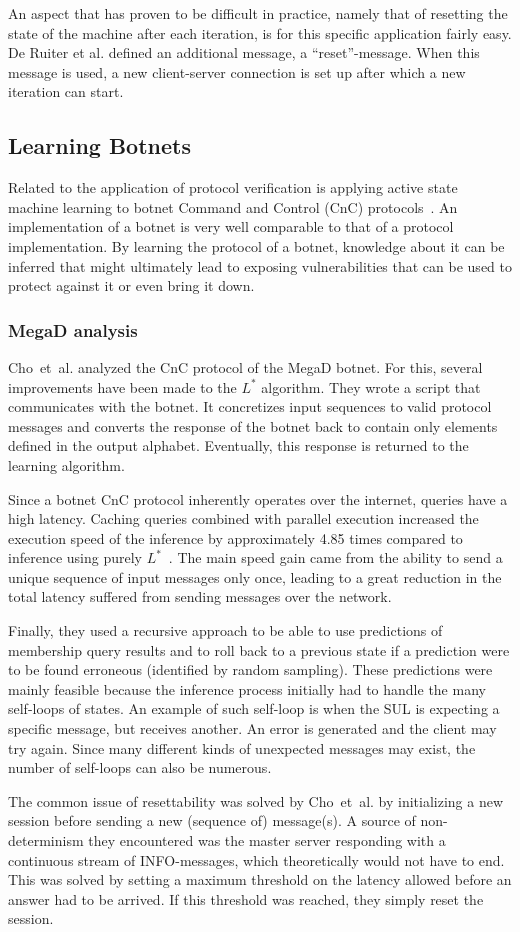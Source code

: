 \documentclass[multi,crop=false,class=article]{standalone}
\begin{document}
An aspect that has proven to be difficult in practice, namely
that of resetting the state of the machine after each iteration, is for this
specific application fairly easy. De Ruiter et al. defined an additional
message, a ``reset''-message. When this message is used, a new client-server 
connection is set up after which a new iteration can start.

\subsection{Learning Botnets}
Related to the application of protocol verification is applying active state
machine learning to botnet Command and Control (CnC) protocols~\cite{Cho2010}.
An implementation of a botnet is very well comparable to that of a protocol
implementation. By learning the protocol of a botnet, knowledge about it
can be inferred that might ultimately lead to exposing vulnerabilities
that can be used to protect against it or even bring it down.

\subsubsection{MegaD analysis}
Cho~et~al. analyzed the CnC protocol of the MegaD botnet.
For this, several improvements have been made to the $L^*$ algorithm.
They wrote a script that communicates with the botnet. It concretizes input
sequences to valid protocol messages and converts the response of the botnet
back to contain only elements defined in the output alphabet. Eventually, this
response is returned to the learning algorithm.

Since a botnet CnC protocol inherently operates over the internet, queries have
a high latency. Caching queries combined with parallel execution increased the execution speed
of the inference by approximately 4.85 times compared to inference using purely
$L^*$~\cite{Cho2010}. The main speed gain came from the ability to send
a unique sequence of input messages only once, leading to a great reduction in
the total latency suffered from sending messages over the network.

Finally, they used a recursive approach to be able to use predictions of
membership query results and to roll back to a previous state if a prediction
were to be found erroneous (identified by random sampling). These predictions
were mainly feasible because the inference process initially had to handle the
many self-loops of states. An example of such self-loop is when the SUL is
expecting a specific message, but receives another. An error is generated and
the client may try again. Since many different kinds of unexpected messages may
exist, the number of self-loops can also be numerous.

The common issue of resettability was solved by Cho~et~al. by initializing a
new session before sending a new (sequence of) message(s). A source of
non-determinism they encountered was the master server responding with a
continuous stream of INFO-messages, which theoretically would not have to end.
This was solved by setting a maximum threshold on the latency allowed before an
answer had to be arrived. If this threshold was reached, they simply reset the
session.
\end{document}
